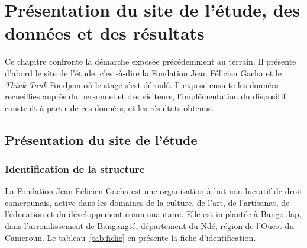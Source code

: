 \chapter{Présentation du site de l'étude, des données et des résultats}
\label{chap:terrain}

\introchap

Ce chapitre confronte la démarche exposée précédemment au terrain. Il présente
d'abord le site de l'étude, c'est-à-dire la Fondation Jean Félicien Gacha et le
\emph{Think Tank} Foudjem où le stage s'est déroulé. Il expose ensuite les
données recueillies auprès du personnel et des visiteurs, l'implémentation du
dispositif construit à partir de ces données, et les résultats obtenus.

\section{Présentation du site de l'étude}
\label{sec:site}

\subsection{Identification de la structure}

La Fondation Jean Félicien Gacha est une organisation à but non lucratif de
droit camerounais, active dans les domaines de la culture, de l'art, de
l'artisanat, de l'éducation et du développement communautaire. Elle est
implantée à Bangoulap, dans l'arrondissement de Bangangté, département du Ndé,
région de l'Ouest du Cameroun. Le tableau~\ref{tab:fiche} en présente la fiche
d'identification.

